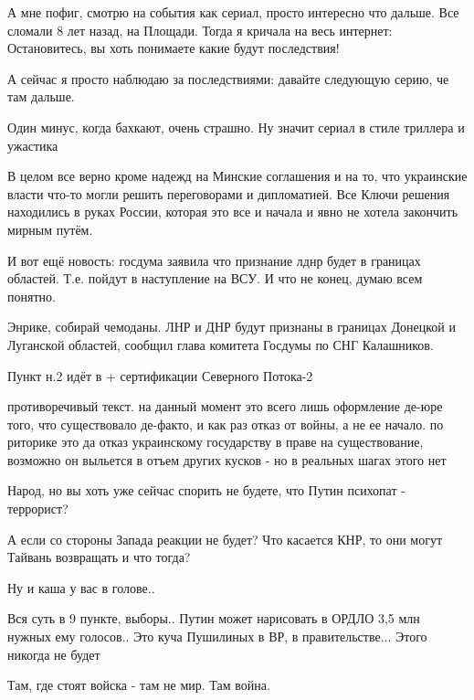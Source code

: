\begin{itemize}

А мне пофиг, смотрю на события как сериал, просто интересно что дальше. Все
сломали 8 лет назад, на Площади. Тогда я кричала на весь интернет:
Остановитесь, вы хоть понимаете какие будут последствия!

А сейчас я просто наблюдаю за последствиями: давайте следующую серию, че там
дальше.

Один минус, когда бахкают, очень страшно. Ну значит сериал в стиле триллера и
ужастика


В целом все верно кроме надежд на Минские соглашения и на то, что украинские
власти что-то могли решить переговорами и дипломатией. Все Ключи решения
находились в руках России, которая это все и начала и явно не хотела закончить
мирным путём.

И вот ещё новость: госдума заявила что признание лднр будет в границах
областей. Т.е. пойдут в наступление на ВСУ. И что не конец, думаю всем понятно.


Энрике, собирай чемоданы. ЛНР и ДНР будут признаны в границах Донецкой и
Луганской областей, сообщил глава комитета Госдумы по СНГ Калашников.

Пункт н.2 идёт в + сертификации Северного Потока-2


противоречивый текст. на данный момент это всего лишь оформление де-юре того,
что существовало де-факто, и как раз отказ от войны, а не ее начало. по
риторике это да отказ украинскому государству в праве на существование,
возможно он выльется в отъем других кусков - но в реальных шагах этого нет

Народ, но вы хоть уже сейчас спорить не будете, что Путин психопат - террорист?

А если со стороны Запада реакции не будет?
Что касается КНР, то они могут Тайвань возвращать и что тогда?

Ну и каша у вас в голове..


Вся суть в 9 пункте, выборы.. Путин может нарисовать в ОРДЛО 3,5 млн нужных ему
голосов.. Это куча Пушилиных в ВР, в правительстве... Этого никогда не будет

Там, где стоят войска - там не мир. Там война.


\end{itemize}
